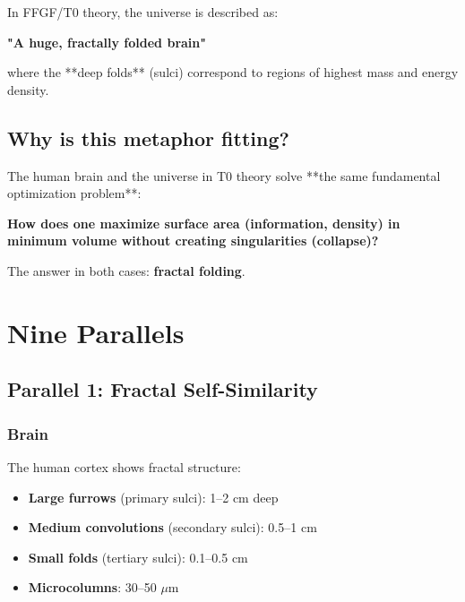 	In FFGF/T0 theory, the universe is described as:

	\begin{center}
		\textbf{"A huge, fractally folded brain"}
	\end{center}

	where the **deep folds** (sulci) correspond to regions of highest mass and energy density.

	\subsection{Why is this metaphor fitting?}

	\begin{important}
		The human brain and the universe in T0 theory solve **the same fundamental optimization problem**:

		\vspace{0.3cm}

		\textbf{How does one maximize surface area (information, density) in minimum volume without creating singularities (collapse)?}

		\vspace{0.3cm}

		The answer in both cases: \textbf{fractal folding}.
	\end{important}

	\section{Nine Parallels}

	\subsection{Parallel 1: Fractal Self-Similarity}

	\subsubsection{Brain}

	The human cortex shows fractal structure:
	\begin{itemize}
		\item \textbf{Large furrows} (primary sulci): 1--2 cm deep
		\item \textbf{Medium convolutions} (secondary sulci): 0.5--1 cm
		\item \textbf{Small folds} (tertiary sulci): 0.1--0.5 cm
		\item \textbf{Microcolumns}: 30--50 $\mu$m
	\end{itemize}

